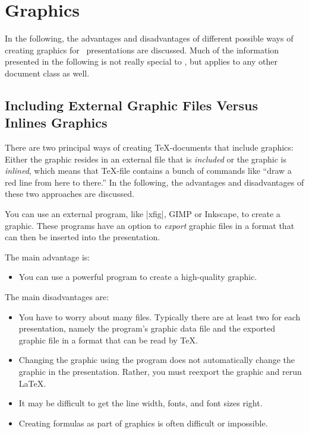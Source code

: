 %
%
%

\section{Graphics}
\label{section-graphics}

In the following, the advantages and disadvantages of different possible ways of creating graphics for \beamer\ presentations are discussed. Much of the information presented in the following is not really special to \beamer, but applies to any other document class as well.


\subsection{Including External Graphic Files Versus Inlines Graphics}

There are two principal ways of creating \TeX-documents that include graphics: Either the graphic resides in an external file that is \emph{included} or the graphic is \emph{inlined}, which means that \TeX-file contains a bunch of commands like ``draw a red line from here to there.'' In the following, the advantages and disadvantages of these two approaches are discussed.

You can use an external program, like |xfig|, GIMP or Inkscape, to create a graphic. These programs have an option to \emph{export} graphic files in a format that can then be inserted into the presentation.

The main advantage is:
\begin{itemize}
\item
  You can use a powerful program to create a high-quality graphic.
\end{itemize}

The main disadvantages are:
\begin{itemize}
\item
  You  have to worry about many files. Typically there are at least two for each presentation, namely the program's graphic data file and the exported graphic file in a format that can be read by \TeX.
\item
  Changing the graphic using the program does not automatically change the graphic in the presentation. Rather, you must reexport the graphic and rerun \LaTeX.
\item
  It may be difficult to get the line width, fonts, and font sizes right.
\item
  Creating formulas as part of graphics is often difficult or impossible.
\end{itemize}

